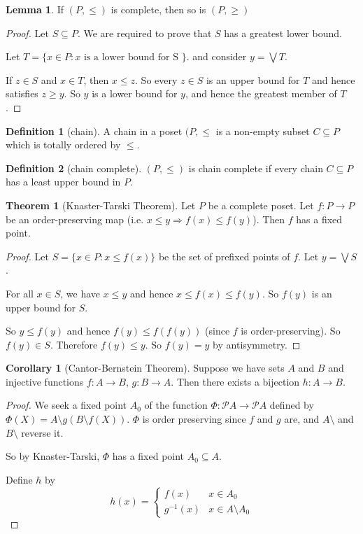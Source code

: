 \documentclass[a4paper]{article}
\theoremstyle{definition}
\newtheorem*{thm}{Theorem}
\newtheorem*{defi}{Definition}
\newtheorem*{lemma}{Lemma}
\newtheorem*{cor}{Corollary}
\begin{document}
\begin{lemma}
  If $(P, \leq)$ is complete, then so is $(P, \geq)$
\end{lemma}

\begin{proof}
  Let $S\subseteq P$. We are required to prove that $S$ has a greatest lower bound.

  Let $T = \{x\in P: x\text{ is a lower bound for S }\}$. and consider $y = \bigvee T$.

  If $z\in S$ and $x\in T$, then $x\leq z$. So every $z\in S$ is an upper bound for $T$ and hence satisfies $z\geq y$. So $y$ is a lower bound for $y$, and hence the greatest member of $T$.
\end{proof}

\begin{defi}[chain]
  A chain in a poset $(P, \leq$ is a non-empty subset $C\subseteq P$ which is totally ordered by $\leq$.
\end{defi}

\begin{defi}[chain complete]
  $(P, \leq)$ is chain complete if every chain $C\subseteq P$ has a least upper bound in $P$.
\end{defi}

\begin{thm}[Knaster-Tarski Theorem]
  Let $P$ be a complete poset. Let $f: P\to P$ be an order-preserving map (i.e. $x\leq y \Rightarrow f(x)\leq f(y)$). Then $f$ has a fixed point.
\end{thm}

\begin{proof}
  Let $S = \{x\in P: x\leq f(x)\}$ be the set of prefixed points of $f$. Let $y = \bigvee S$.

  For all $x\in S$, we have $x \leq y$ and hence $x \leq f(x) \leq f(y)$. So $f(y)$ is an upper bound for $S$.

  So $y\leq f(y)$ and hence $f(y) \leq f(f(y))$ (since $f$ is order-preserving). So $f(y) \in S$. Therefore $f(y) \leq y$. So $f(y) = y$ by antisymmetry.
\end{proof}

\begin{cor}[Cantor-Bernstein Theorem]
  Suppose we have sets $A$ and $B$ and injective functions $f: A\to B$, $g: B\to A$. Then there exists a bijection $h: A\to B$.
\end{cor}

\begin{proof}
  We seek a fixed point $A_0$ of the function $\Phi: \mathcal{P}A \to \mathcal{P}A$ defined by $\Phi(X) = A\setminus g(B\setminus f(X))$. $\Phi$ is order preserving since $f$ and $g$ are, and $A\setminus$ and $B\setminus$ reverse it.

So by Knaster-Tarski, $\Phi$ has a fixed point $A_0 \subseteq A$. 

Define $h$ by
$$h(x) = 
\begin{cases}
  f(x) & x\in A_0\\
  g^{-1}(x) & x\in A\setminus A_0
\end{cases}$$
\end{proof}
\end{document}
